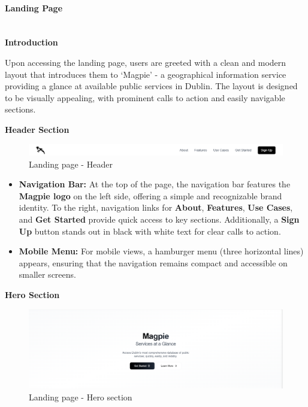 \paragraph{Landing Page}\mbox{}\\
\textbf{Introduction}

Upon accessing the landing page, users are greeted with a clean and modern
layout that introduces them to `Magpie' {-} a geographical information service
providing a glance at available public services in Dublin. The layout is
designed to be visually appealing, with prominent calls to action and easily
navigable sections.

\newpage{}

\textbf{Header Section}

\begin{figure}[htbp]
    \centering{}
    \includegraphics[width=1\textwidth]{images/site/landing/landing_6_header.png}
    \caption{Landing page {-} Header}
\end{figure}

\begin{itemize}
    \item{} \textbf{Navigation Bar:} At the top of the page, the navigation bar
    features the \textbf{Magpie logo} on the left side, offering a simple and
    recognizable brand identity. To the right, navigation links for
    \textbf{About}, \textbf{Features}, \textbf{Use Cases}, and \textbf{Get
    Started} provide quick access to key sections. Additionally, a \textbf{Sign
    Up} button stands out in black with white text for clear calls to action.
    \item{} \textbf{Mobile Menu:} For mobile views, a hamburger menu (three
    horizontal lines) appears, ensuring that the navigation remains compact and
    accessible on smaller screens.
\end{itemize}

\textbf{Hero Section}

\begin{figure}[htbp]
    \centering{}
    \includegraphics[width=1\textwidth]{images/site/landing/landing_1_hero.png}
    \caption{Landing page {-} Hero section}
\end{figure}

